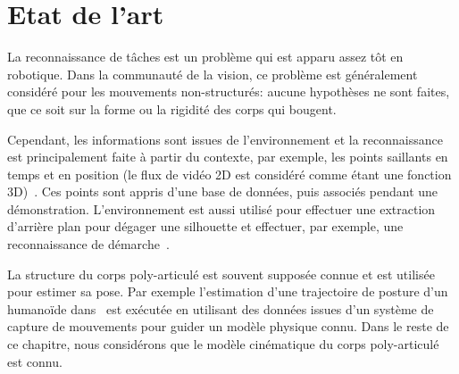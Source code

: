 \section{Etat de l'art}
La reconnaissance de t\^aches est un probl\`eme qui est apparu assez
t\^ot en robotique. Dans la communaut\'e de la vision, ce probl\`eme
est g\'en\'eralement consid\'er\'e pour les mouvements non-structur\'es:
aucune hypoth\`eses ne sont faites, que ce soit sur la forme ou la rigidit\'e
des corps qui bougent.

Cependant, les informations sont issues de l'environnement et la reconnaissance
est principalement faite \`a partir du contexte, par exemple, les points
saillants en temps et en position (le flux de vid\'eo 2D est considéré comme 
étant une fonction 3D)~\cite{laptev05}. Ces points sont appris d'une base de donn\'ees,
puis associ\'es pendant une d\'emonstration. L'environnement est aussi
utilis\'e pour effectuer une extraction d'arri\`ere plan pour 
d\'egager une silhouette et effectuer, par exemple, une reconnaissance 
de d\'emarche~\cite{liu05}.

La structure du corps poly-articul\'e est souvent suppos\'ee connue et est
utilis\'ee pour estimer sa pose. Par exemple l'estimation d'une
trajectoire de posture d'un humano\"ide dans~\cite{zordan03} est ex\'ecut\'ee
en utilisant des donn\'ees issues d'un syst\`eme de capture de mouvements pour 
guider un mod\`ele physique connu.
Dans le reste de ce chapitre, nous consid\'erons que le modèle cinématique du corps poly-articul\'e
est connu.

